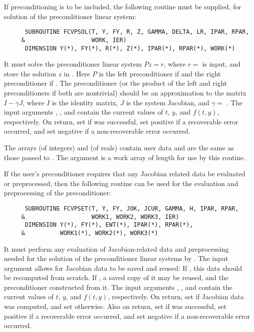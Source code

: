 \begin{Steps}
  If preconditioning is to be included, the following routine must be
  supplied, for solution of the preconditioner linear system:
\begin{verbatim}
      SUBROUTINE FCVPSOL(T, Y, FY, R, Z, GAMMA, DELTA, LR, IPAR, RPAR,
     &                   WORK, IER)
      DIMENSION Y(*), FY(*), R(*), Z(*), IPAR(*), RPAR(*), WORK(*)
\end{verbatim}
  It must solve the preconditioner linear system $Pz = r$, where $r =$  
  is input, and store the solution $z$ in . Here $P$ is the left 
  preconditioner if  and the right preconditioner if .  
  The preconditioner (or the product of the left and right preconditioners 
  if both are nontrivial) should be an  approximation to the matrix 
  $I - \gamma J$, where $I$ is the identity matrix, $J$ is the system Jacobian,
  and $\gamma =$ .
  The input arguments , , and  contain the current
  values of $t$, $y$, and $f(t,y)$, respectively.
  On return, set  if  was successful, set 
  positive if a recoverable error occurred, and set  negative if a 
  non-recoverable error occurred.

  The arrays  (of integers) and  (of reals) contain user data
  and are the same as those passed to .
  The argument  is a work array of length  for use by this
  routine.

  If the user's preconditioner requires that any Jacobian related data be evaluated
  or preprocessed, then the following routine can be used for the evaluation and 
  preprocessing of the preconditioner:
\begin{verbatim}
      SUBROUTINE FCVPSET(T, Y, FY, JOK, JCUR, GAMMA, H, IPAR, RPAR,
     &                   WORK1, WORK2, WORK3, IER)
      DIMENSION Y(*), FY(*), EWT(*), IPAR(*), RPAR(*), 
     &          WORK1(*), WORK2(*), WORK3(*) 
\end{verbatim}
  It must perform any evaluation of Jacobian-related data and preprocessing needed
  for the solution of the preconditioner linear systems by .
  The input argument  allows for Jacobian data to be saved and reused:
  If , this data should be recomputed from scratch. If ,
  a saved copy of it may be reused, and the preconditioner constructed from it.
  The input arguments , , and  contain the current
  values of $t$, $y$, and $f(t,y)$, respectively.
  On return, set  if Jacobian data was computed, and set
   otherwise.
  Also on return, set  if  was successful, set 
  positive if a recoverable error occurred, and set  negative if a 
  non-recoverable error occurred.
  

\end{Steps}
